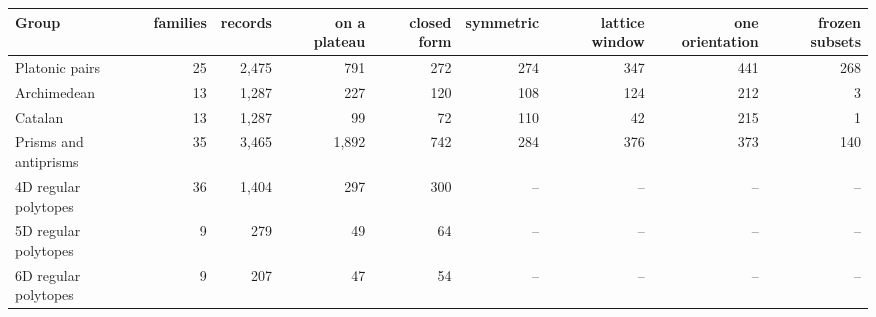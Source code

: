 \begin{tabular}{lrrrrrrrr}
\toprule
Group & families & records & on a plateau & closed form & symmetric & lattice window & one orientation & frozen subsets \\
\midrule
Platonic pairs & 25 & 2,475 & 791 & 272 & 274 & 347 & 441 & 268 \\
Archimedean & 13 & 1,287 & 227 & 120 & 108 & 124 & 212 & 3 \\
Catalan & 13 & 1,287 & 99 & 72 & 110 & 42 & 215 & 1 \\
Prisms and antiprisms & 35 & 3,465 & 1,892 & 742 & 284 & 376 & 373 & 140 \\
4D regular polytopes & 36 & 1,404 & 297 & 300 & -- & -- & -- & -- \\
5D regular polytopes & 9 & 279 & 49 & 64 & -- & -- & -- & -- \\
6D regular polytopes & 9 & 207 & 47 & 54 & -- & -- & -- & -- \\
\bottomrule
\end{tabular}
